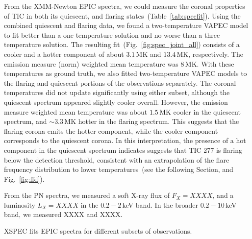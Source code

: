 \documentclass[twocolumn]{aastex631}
\begin{document}
From the XMM-Newton EPIC spectra, we could measure the coronal properties of TIC in both its quiescent, and flaring states~(Table~\ref{tab:specfit}). Using the combined quiescent and flaring data, we found a two-temperature VAPEC model to fit better than a one-temperature solution and no worse than a three-temperature solution. The resulting fit~(Fig.~\ref{fig:spec_joint_all}) consists of a cooler and a hotter component of about $3.1\,$MK and $13.4\,$MK, respectively. The emission measure (norm) weighted mean temperature was $8\,$MK. With these temperatures as ground truth, we also fitted two-temperature VAPEC models to the flaring and quiescent portions of the observations separately. The coronal temperatures did not update significantly using either subset, although the quiescent spectrum appeared slightly cooler overall. However, the emission measure weighted mean temperature was about $1.5\,$MK cooler in the quiescent spectrum, and $\sim3.3\,$MK hotter in the flaring spectrum. This suggests that the flaring corona emits the hotter component, while the cooler component corresponds to the quiescent corona. In this interpretation, the presence of a hot component in the quiescent spectrum indicates suggests that TIC 277 is flaring below the detection threshold, consistent with an extrapolation of the flare frequency distribution to lower temperatures~(see the following Section, and Fig.~\ref{fig:ffd}).

From the PN spectra, we measured a soft X-ray flux of $F_X=XXXX$, and a luminosity $L_X=XXXX$ in the $0.2-2\,$keV band. In the broader $0.2-10\,$keV band, we measured XXXX and XXXX.
 \begin{table}
\centering
    \caption{XSPEC fits EPIC spectra for different subsets of observations.}
    
        \label{tab:specfit}
\end{table}


\end{document}
